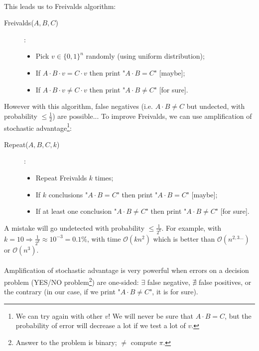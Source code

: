 \documentclass[11pt,a4paper]{scrartcl} %
\theoremstyle{definition}
\begin{document}
\begin{itemize}
	\paragraph{}
	This leads us to Freivalds algorithm:
	\begin{description}
	\item[Freivalds($A,B,C$)]:\\
	\begin{itemize}
		\item Pick $v\in\{0,1\}^n$ randomly (using uniform distribution);
		\item If $A\cdot B\cdot v = C\cdot v$ then print "$A\cdot B=C$" [maybe];
		\item If $A\cdot B\cdot v \neq C\cdot v$ then print "$A\cdot B\neq C$" [for sure].
	\end{itemize}
	\end{description}
	However with this algorithm, false negatives (i.e. $A\cdot B\neq C$ but undected, with probability $\leq \frac{1}{2}$) are possible... To improve Freivalds, we can use amplification of stochastic advantage\footnote{We can try again with other $v$! We will never be sure that $A\cdot B=C$, but the probability of error will decrease a lot if we test a lot of $v$.}:
	\begin{description}
	\item[Repeat($A,B,C,k$)]:\\
	\begin{itemize}
		\item Repeat Freivalds $k$ times;
		\item If $k$ conclusions "$A\cdot B=C$" then print "$A\cdot B=C$" [maybe];
		\item If at least one conclusion "$A\cdot B\neq C$" then print "$A\cdot B\neq C$" [for sure].
	\end{itemize}
	\end{description}
	A mistake will go undetected with probability $\leq \frac{1}{2^k}$. For example, with $k=10\Rightarrow \frac{1}{2^k}\approx 10^{-3}=0.1\%$, with time $\mathcal{O}(kn^{2})$ which is better than $\mathcal{O}(n^{2,3...})$ or $\mathcal{O}(n^{3})$.
	\paragraph{}
	Amplification of stochastic advantage is very powerful when errors on a decision problem (YES/NO problem\footnote{Answer to the problem is binary; $\neq$ compute $\pi$.}) are one-sided: $\exists$ false negative, $\nexists$ false positives, or the contrary (in our case, if we print "$A\cdot B\neq C$", it is for sure).
	

\end{itemize}
\end{document}

